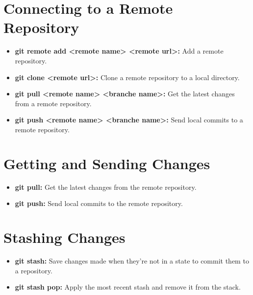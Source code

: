 \documentclass[a4paper, 11pt]{article}
\numberwithin{equation}{section}
\theoremstyle{definition}
\theoremstyle{remark}
\begin{document}
\section{Connecting to a Remote Repository}
\begin{itemize}[label=$\bullet$]
    \item \textbf{git remote add <remote name> <remote url>:} Add a remote repository.
    \item \textbf{git clone <remote url>:} Clone a remote repository to a local directory.
    \item \textbf{git pull <remote name> <branche name>:} Get the latest changes from a remote repository.
    \item \textbf{git push <remote name> <branche name>:} Send local commits to a remote repository.
\end{itemize}

\section{Getting and Sending Changes}
\begin{itemize}[label=$\bullet$]
    \item \textbf{git pull:} Get the latest changes from the remote repository.
    \item \textbf{git push:} Send local commits to the remote repository.
\end{itemize}

\section{Stashing Changes}
\begin{itemize}[label=$\bullet$]
    \item \textbf{git stash:} Save changes made when they're not in a state to commit them to a repository.
    \item \textbf{git stash pop:} Apply the most recent stash and remove it from the stack.
\end{itemize}
\end{document}
